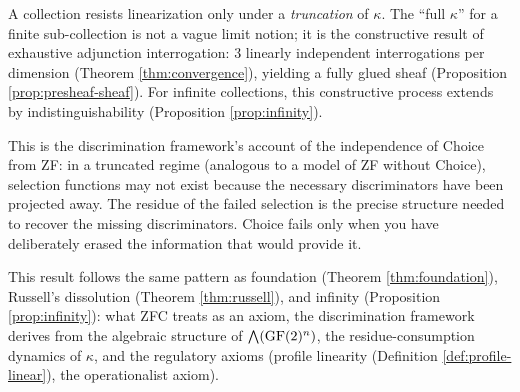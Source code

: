 \begin{remark}
A collection resists linearization only under a
\emph{truncation} of $\kappa$. The ``full $\kappa$'' for
a finite sub-collection is not a vague limit notion; it
is the constructive result of exhaustive adjunction
interrogation: $3$ linearly independent interrogations
per dimension (Theorem \ref{thm:convergence}), yielding
a fully glued sheaf (Proposition \ref{prop:presheaf-sheaf}).
For infinite collections, this constructive process
extends by indistinguishability (Proposition
\ref{prop:infinity}).

This is the discrimination framework's account of the
independence of Choice from ZF: in a truncated regime
(analogous to a model of ZF without Choice), selection
functions may not exist because the necessary
discriminators have been projected away. The residue of
the failed selection is the precise structure needed to
recover the missing discriminators. Choice fails only
when you have deliberately erased the information that
would provide it.
\end{remark}

\begin{remark}
This result follows the same pattern as foundation
(Theorem \ref{thm:foundation}), Russell's dissolution
(Theorem \ref{thm:russell}), and infinity (Proposition
\ref{prop:infinity}): what ZFC treats as an axiom, the
discrimination framework derives from the algebraic
structure of $\bigwedge(\operatorname{GF}(2)^n)$, the
residue-consumption dynamics of $\kappa$, and the
regulatory axioms (profile linearity (Definition \ref{def:profile-linear}), the operationalist
axiom).
\end{remark}

